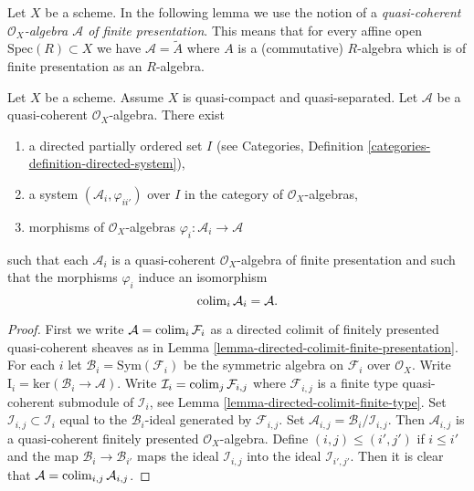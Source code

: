 \noindent
Let $X$ be a scheme. In the following lemma we use the notion
of a {\it quasi-coherent $\mathcal{O}_X$-algebra $\mathcal{A}$
of finite presentation}. This means that for every affine open
$\text{Spec}(R) \subset X$ we have $\mathcal{A} = \widetilde{A}$
where $A$ is a (commutative) $R$-algebra which is of finite presentation
as an $R$-algebra.

\begin{lemma}
\label{lemma-algebra-directed-colimit-finite-presentation}
Let $X$ be a scheme. Assume $X$ is quasi-compact and quasi-separated.
Let $\mathcal{A}$ be a quasi-coherent $\mathcal{O}_X$-algebra.
There exist
\begin{enumerate}
\item a directed partially ordered set $I$ (see
Categories, Definition \ref{categories-definition-directed-system}),
\item a system $(\mathcal{A}_i, \varphi_{ii'})$
over $I$ in the category of $\mathcal{O}_X$-algebras,
\item morphisms of $\mathcal{O}_X$-algebras
$\varphi_i : \mathcal{A}_i \to \mathcal{A}$
\end{enumerate}
such that each $\mathcal{A}_i$ is a quasi-coherent $\mathcal{O}_X$-algebra
of finite presentation and such that the morphisms $\varphi_i$
induce an isomorphism
$$
\mathop{\rm colim}\nolimits_i \mathcal{A}_i
=
\mathcal{A}.
$$
\end{lemma}

\begin{proof}
First we write $\mathcal{A} = \mathop{\rm colim}\nolimits_i \mathcal{F}_i$ as a directed
colimit of finitely presented quasi-coherent sheaves as in
Lemma \ref{lemma-directed-colimit-finite-presentation}.
For each $i$ let $\mathcal{B}_i = \text{Sym}(\mathcal{F}_i)$ be the
symmetric algebra on $\mathcal{F}_i$ over $\mathcal{O}_X$. Write
$\text{I}_i = \text{ker}(\mathcal{B}_i \to \mathcal{A})$. Write
$\mathcal{I}_i = \mathop{\rm colim}\nolimits_j \mathcal{F}_{i, j}$ where
$\mathcal{F}_{i, j}$ is a finite type quasi-coherent submodule of
$\mathcal{I}_i$, see
Lemma \ref{lemma-directed-colimit-finite-type}.
Set $\mathcal{I}_{i, j} \subset \mathcal{I}_i$
equal to the $\mathcal{B}_i$-ideal generated by $\mathcal{F}_{i, j}$.
Set $\mathcal{A}_{i, j} = \mathcal{B}_i/\mathcal{I}_{i, j}$.
Then $\mathcal{A}_{i, j}$ is a quasi-coherent finitely presented
$\mathcal{O}_X$-algebra. Define $(i, j) \leq (i', j')$ if
$i \leq i'$ and the map $\mathcal{B}_i \to \mathcal{B}_{i'}$
maps the ideal $\mathcal{I}_{i, j}$ into the ideal $\mathcal{I}_{i', j'}$.
Then it is clear that $\mathcal{A} = \mathop{\rm colim}\nolimits_{i, j} \mathcal{A}_{i, j}$.
\end{proof}

